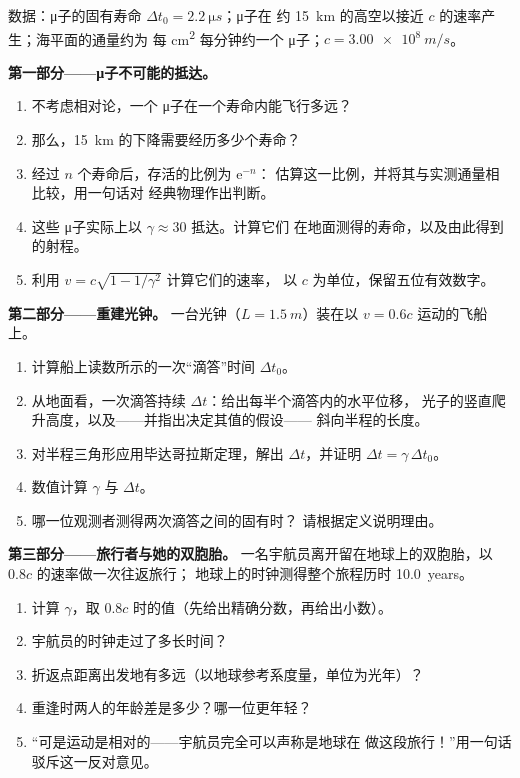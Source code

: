 \begin{problem}
\label{pb:g12:special-relativity:1}
数据：μ子的固有寿命 $\Delta t_0 = \qty{2.2}{\micro s}$；μ子在
约 \qty{15}{km} 的高空以接近 $c$ 的速率产生；海平面的通量约为
每 \unit{cm^2} 每分钟约一个 μ子；$c = \qty{3.00e8}{m/s}$。

\medskip
\noindent\textbf{第一部分——μ子不可能的抵达。}
\begin{enumerate}
  \item 不考虑相对论，一个 μ子在一个寿命内能飞行多远？
  \item 那么，\qty{15}{km} 的下降需要经历多少个寿命？
  \item 经过 $n$ 个寿命后，存活的比例为 $\mathrm{e}^{-n}$：
        估算这一比例，并将其与实测通量相比较，用一句话对
        经典物理作出判断。
  \item 这些 μ子实际上以 $\gamma \approx 30$ 抵达。计算它们
        在地面测得的寿命，以及由此得到的射程。
  \item 利用 $v = c\sqrt{1 - 1/\gamma^2}$ 计算它们的速率，
        以 $c$ 为单位，保留五位有效数字。
\end{enumerate}

\medskip
\noindent\textbf{第二部分——重建光钟。}
一台光钟（$L = \qty{1.5}{m}$）装在以 $v = 0.6c$ 运动的飞船上。
\begin{enumerate}[resume]
  \item 计算船上读数所示的一次“滴答”时间 $\Delta t_0$。
  \item 从地面看，一次滴答持续 $\Delta t$：给出每半个滴答内的水平位移，
        光子的竖直爬升高度，以及——并指出决定其值的假设——
        斜向半程的长度。
  \item 对半程三角形应用毕达哥拉斯定理，解出
        $\Delta t$，并证明 $\Delta t = \gamma\,\Delta t_0$。
  \item 数值计算 $\gamma$ 与 $\Delta t$。
  \item 哪一位观测者测得两次滴答之间的固有时？
        请根据定义说明理由。
\end{enumerate}

\medskip
\noindent\textbf{第三部分——旅行者与她的双胞胎。}
一名宇航员离开留在地球上的双胞胎，以 $0.8c$ 的速率做一次往返旅行；
地球上的时钟测得整个旅程历时 \qty{10.0}{years}。
\begin{enumerate}[resume]
  \item 计算 $\gamma$，取 $0.8c$ 时的值（先给出精确分数，再给出小数）。
  \item 宇航员的时钟走过了多长时间？
  \item 折返点距离出发地有多远（以地球参考系度量，单位为光年）？
  \item 重逢时两人的年龄差是多少？哪一位更年轻？
  \item “可是运动是相对的——宇航员完全可以声称是地球在
        做这段旅行！”用一句话驳斥这一反对意见。
\end{enumerate}


\end{problem}
